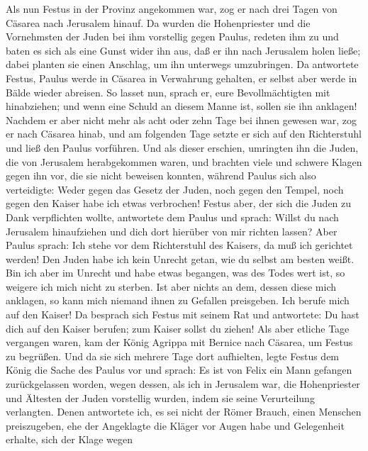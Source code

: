  Als nun Festus in der Provinz angekommen war, zog er nach
drei Tagen von Cäsarea nach Jerusalem hinauf.  Da wurden
die Hohenpriester und die Vornehmsten der Juden bei ihm vorstellig gegen
Paulus,  redeten ihm zu und baten es sich als eine Gunst
wider ihn aus, daß er ihn nach Jerusalem holen ließe; dabei planten sie
einen Anschlag, um ihn unterwegs umzubringen.  Da
antwortete Festus, Paulus werde in Cäsarea in Verwahrung gehalten, er
selbst aber werde in Bälde wieder abreisen.  So lasset
nun, sprach er, eure Bevollmächtigten mit hinabziehen; und wenn eine
Schuld an diesem Manne ist, sollen sie ihn anklagen! 
Nachdem er aber nicht mehr als acht oder zehn Tage bei ihnen gewesen
war, zog er nach Cäsarea hinab, und am folgenden Tage setzte er sich auf
den Richterstuhl und ließ den Paulus vorführen.  Und als
dieser erschien, umringten ihn die Juden, die von Jerusalem
herabgekommen waren, und brachten viele und schwere Klagen gegen ihn
vor, die sie nicht beweisen konnten,  während Paulus sich
also verteidigte: Weder gegen das Gesetz der Juden, noch gegen den
Tempel, noch gegen den Kaiser habe ich etwas verbrochen! 
Festus aber, der sich die Juden zu Dank verpflichten wollte, antwortete
dem Paulus und sprach: Willst du nach Jerusalem hinaufziehen und dich
dort hierüber von mir richten lassen?  Aber Paulus
sprach: Ich stehe vor dem Richterstuhl des Kaisers, da muß ich gerichtet
werden! Den Juden habe ich kein Unrecht getan, wie du selbst am besten
weißt.  Bin ich aber im Unrecht und habe etwas begangen,
was des Todes wert ist, so weigere ich mich nicht zu sterben. Ist aber
nichts an dem, dessen diese mich anklagen, so kann mich niemand ihnen zu
Gefallen preisgeben. Ich berufe mich auf den Kaiser!  Da
besprach sich Festus mit seinem Rat und antwortete: Du hast dich auf den
Kaiser berufen; zum Kaiser sollst du ziehen!  Als aber
etliche Tage vergangen waren, kam der König Agrippa mit Bernice nach
Cäsarea, um Festus zu begrüßen.  Und da sie sich mehrere
Tage dort aufhielten, legte Festus dem König die Sache des Paulus vor
und sprach: Es ist von Felix ein Mann gefangen zurückgelassen worden,
 wegen dessen, als ich in Jerusalem war, die
Hohenpriester und Ältesten der Juden vorstellig wurden, indem sie seine
Verurteilung verlangten.  Denen antwortete ich, es sei
nicht der Römer Brauch, einen Menschen preiszugeben, ehe der Angeklagte
die Kläger vor Augen habe und Gelegenheit erhalte, sich der Klage wegen
